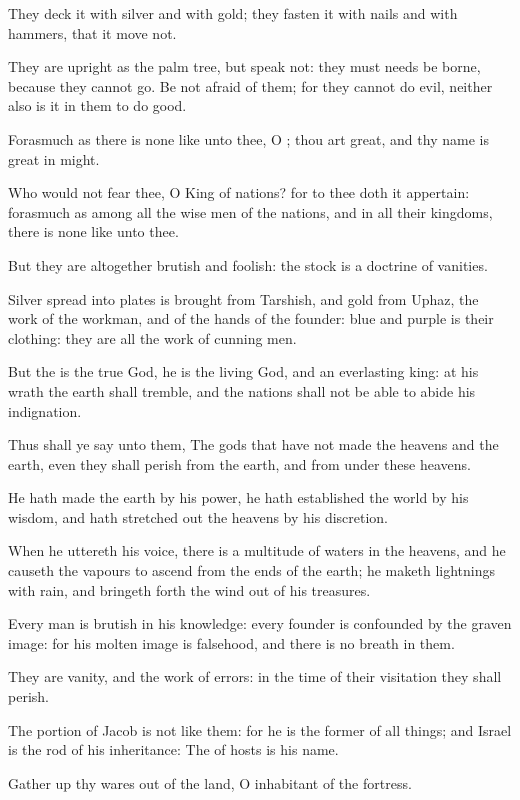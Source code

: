 \verse They deck it with silver and with gold; they fasten it with nails and with hammers, that it move not.

\verse They are upright as the palm tree, but speak not: they must needs be borne, because they cannot go. Be not afraid of them; for they cannot do evil, neither also is it in them to do good.

\verse Forasmuch as there is none like unto thee, O \LORD; thou art great, and thy name is great in might.

\verse Who would not fear thee, O King of nations? for to thee doth it appertain: forasmuch as among all the wise men of the nations, and in all their kingdoms, there is none like unto thee.

\verse But they are altogether brutish and foolish: the stock is a doctrine of vanities.

\verse Silver spread into plates is brought from Tarshish, and gold from Uphaz, the work of the workman, and of the hands of the founder: blue and purple is their clothing: they are all the work of cunning men.

\verse But the \LORD is the true God, he is the living God, and an everlasting king: at his wrath the earth shall tremble, and the nations shall not be able to abide his indignation.

\verse Thus shall ye say unto them, The gods that have not made the heavens and the earth, even they shall perish from the earth, and from under these heavens.

\verse He hath made the earth by his power, he hath established the world by his wisdom, and hath stretched out the heavens by his discretion.

\verse When he uttereth his voice, there is a multitude of waters in the heavens, and he causeth the vapours to ascend from the ends of the earth; he maketh lightnings with rain, and bringeth forth the wind out of his treasures.

\verse Every man is brutish in his knowledge: every founder is confounded by the graven image: for his molten image is falsehood, and there is no breath in them.

\verse They are vanity, and the work of errors: in the time of their visitation they shall perish.

\verse The portion of Jacob is not like them: for he is the former of all things; and Israel is the rod of his inheritance: The \LORD of hosts is his name.

\verse Gather up thy wares out of the land, O inhabitant of the fortress.

